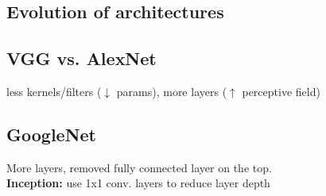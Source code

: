 \subsection{Evolution of architectures}

\subsection{VGG vs. AlexNet}
less kernels/filters ($\downarrow$ params), more layers ($\uparrow$ perceptive field)\\

\subsection{GoogleNet}
More layers, removed fully connected layer on the top.\\
\textbf{Inception:} use 1x1 conv. layers to reduce layer depth\\

